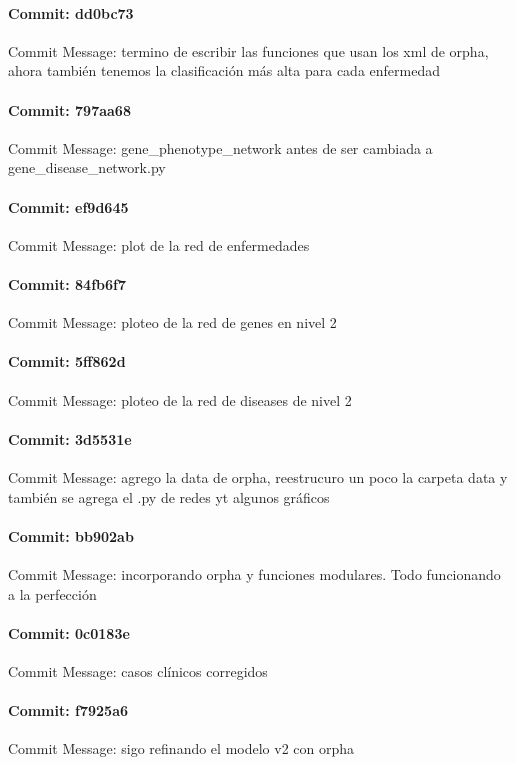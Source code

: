 \documentclass{article}
\begin{document}
\paragraph{Commit: dd0bc73}
Commit Message: termino de escribir las funciones que usan los xml de orpha, ahora también tenemos la clasificación más alta para cada enfermedad

\paragraph{Commit: 797aa68}
Commit Message: gene_phenotype_network antes de ser cambiada a gene_disease_network.py

\paragraph{Commit: ef9d645}
Commit Message: plot de la red de enfermedades

\paragraph{Commit: 84fb6f7}
Commit Message: ploteo de la red de genes en nivel 2

\paragraph{Commit: 5ff862d}
Commit Message: ploteo de la red de diseases de nivel 2

\paragraph{Commit: 3d5531e}
Commit Message: agrego la data de orpha, reestrucuro un poco la carpeta data y también se agrega el .py de redes yt algunos gráficos

\paragraph{Commit: bb902ab}
Commit Message: incorporando orpha y funciones modulares. Todo funcionando a la perfección

\paragraph{Commit: 0c0183e}
Commit Message: casos clínicos corregidos

\paragraph{Commit: f7925a6}
Commit Message: sigo refinando el modelo v2 con orpha
\end{document}
